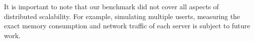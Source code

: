 It is important to note that our benchmark did not cover all aspects of distributed scalability. For example, simulating multiple userts, measuring the exact memory consumption and network traffic of each server is subject to future work.


